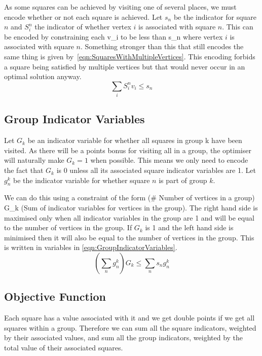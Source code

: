 As some squares can be achieved by visiting one of several places, we must encode whether or not each square is achieved. Let $s_n$ be the indicator for square $n$ and $S_i^n$ the indicator of whether vertex $i$ is associated with square $n$. This can be encoded by constraining each v_i to be less than s_n where vertex $i$ is associated with square $n$. Something stronger than this that still encodes the same thing is given by~\eqref{eqn:SquaresWithMultipleVertices}. This encoding forbids a square being satisfied by multiple vertices but that would never occur in an optimal solution anyway.
\begin{equation}
	\sum_i S_i^n v_i \le s_n
	\label{eqn:SquaresWithMultipleVertices}
\end{equation}

\subsection{Group Indicator Variables}

Let $G_k$ be an indicator variable for whether all squares in group k have been visited. As there will be a points bonus for visiting all in a group, the optimiser will naturally make $G_k = 1$ when possible. This means we only need to encode the fact that $G_k$ is 0 unless all its associated square indicator variables are 1. Let $g_n^k$ be the indicator variable for whether square $n$ is part of group $k$.

We can do this using a constraint of the form (# Number of vertices in a group) \cdot G_k \le (Sum of indicator variables for vertices in the group). The right hand side is maximised only when all indicator variables in the group are 1 and will be equal to the number of vertices in the group. If $G_k$ is 1 and the left hand side is minimised then it will also be equal to the number of vertices in the group. This is written in variables in \eqref{eqn:GroupIndicatorVariables}.
\begin{equation}
	\left( \sum_n g_n^k \right) G_k \le \sum_n s_n g_n^k
	\label{eqn:GroupIndicatorVariables}
\end{equation}

\subsection{Objective Function}

Each square has a value associated with it and we get double points if we get all squares within a group. Therefore we can sum all the square indicators, weighted by their associated values, and sum all the group indicators, weighted by the total value of their associated squares.
